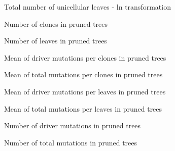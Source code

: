 \documentclass[a4paper]{article}
\begin{document}
\begin{figure}
	\caption{Total number of unicellular leaves - ln transformation}
	\label{Total unic leaves}
\end{figure}
\newpage
\begin{figure}
	\caption{Number of clones in pruned trees}
	\label{Clones}
\end{figure}

\begin{figure}
	\caption{Number of leaves in pruned trees}
	\label{Leaves}
\end{figure}
\newpage
\begin{figure}
	\caption{Mean of driver mutations per clones in pruned trees}
	\label{Drivers per clones}
\end{figure}

\begin{figure}
	\caption{Mean of total mutations per clones in pruned trees}
	\label{Total per clones}
\end{figure}
\newpage
\begin{figure}
	\caption{Mean of driver mutations per leaves in pruned trees}
	\label{Drivers per leaves}
\end{figure}

\begin{figure}
	\caption{Mean of total mutations per leaves in pruned trees}
	\label{Total per leaves}
\end{figure}
\newpage
\begin{figure}
	\caption{Number of driver mutations in pruned trees}
	\label{Drivers unique}
\end{figure}

\begin{figure}
	\caption{Number of total mutations in pruned trees}
	\label{Total unique}
\end{figure}
\restoregeometry
\end{document}
